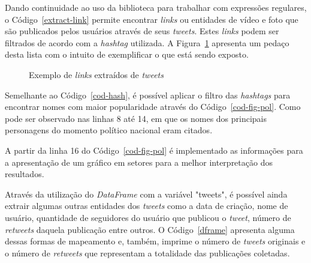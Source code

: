 Dando continuidade ao uso da biblioteca para trabalhar com expressões regulares, o Código~\ref{extract-link} permite encontrar \textit{links} ou entidades de vídeo e foto que são publicados pelos usuários através de seus \textit{tweets}. Estes \textit{links} podem ser filtrados de acordo com a \textit{hashtag} utilizada. A Figura~\ref{links} apresenta um pedaço desta lista com o intuito de exemplificar o que está sendo exposto.

\begin{figure}[h]
	\centering
	\vspace{0.1cm}
	\caption{Exemplo de \textit{links} extraídos de \textit{tweets}}
	\label{links}
\end{figure}




Semelhante ao Código~\ref{cod-hash}, é possível aplicar o filtro das \textit{hashtags} para encontrar nomes com maior popularidade através do Código~\ref{cod-fig-pol}. Como pode ser observado nas linhas 8 até 14, em que os nomes dos principais personagens do momento político nacional eram citados.



A partir da linha 16 do Código~\ref{cod-fig-pol} é implementado as informações para a apresentação de um gráfico em setores para a melhor interpretação dos resultados.

Através da utilização do \textit{DataFrame} com a variável "tweets", é possível ainda extrair algumas outras entidades dos \textit{tweets} como a data de criação, nome de usuário, quantidade de seguidores do usuário que publicou o \textit{tweet}, número de \textit{retweets} daquela publicação entre outros. O Código~\ref{dframe} apresenta alguma dessas formas de mapeamento e, também, imprime o número de \textit{tweets} originais e o número de \textit{retweets} que representam a totalidade das publicações coletadas.


